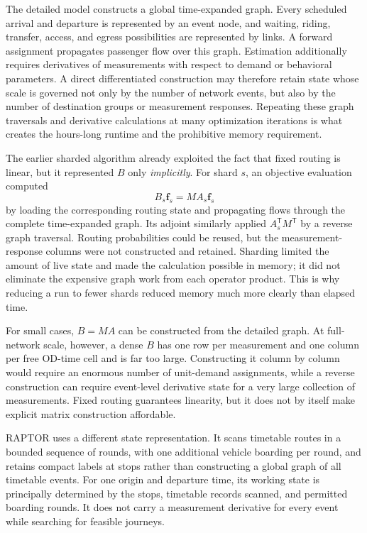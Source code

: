 The detailed model constructs a global time-expanded graph. Every scheduled
arrival and departure is represented by an event node, and waiting, riding,
transfer, access, and egress possibilities are represented by links. A forward
assignment propagates passenger flow over this graph. Estimation additionally
requires derivatives of measurements with respect to demand or behavioral
parameters. A direct differentiated construction may therefore retain state
whose scale is governed not only by the number of network events, but also by
the number of destination groups or measurement responses. Repeating these
graph traversals and derivative calculations at many optimization iterations
is what creates the hours-long runtime and the prohibitive memory requirement.

The earlier sharded algorithm already exploited the fact that fixed routing is
linear, but it represented $B$ only \emph{implicitly}. For shard $s$, an
objective evaluation computed
\[
 B_s\bm f_s=M A_s\bm f_s
\]
by loading the corresponding routing state and propagating flows through the
complete time-expanded graph. Its adjoint similarly applied
$A_s^{\mathsf T}M^{\mathsf T}$ by a reverse graph traversal. Routing
probabilities could be reused, but the measurement-response columns were not
constructed and retained. Sharding limited the amount of live state and made
the calculation possible in memory; it did not eliminate the expensive graph
work from each operator product. This is why reducing a run to fewer shards
reduced memory much more clearly than elapsed time.

For small cases, $B=MA$ can be constructed from the detailed graph. At full-
network scale, however, a dense $B$ has one row per measurement and one column
per free OD-time cell and is far too large. Constructing it column by column
would require an enormous number of unit-demand assignments, while a reverse
construction can require event-level derivative state for a very large
collection of measurements. Fixed routing guarantees linearity, but it does
not by itself make explicit matrix construction affordable.

RAPTOR uses a different state representation. It scans timetable routes in a
bounded sequence of rounds, with one additional vehicle boarding per round,
and retains compact labels at stops rather than constructing a global graph of
all timetable events. For one origin and departure time, its working state is
principally determined by the stops, timetable records scanned, and permitted
boarding rounds. It does not carry a measurement derivative for every event
while searching for feasible journeys.

